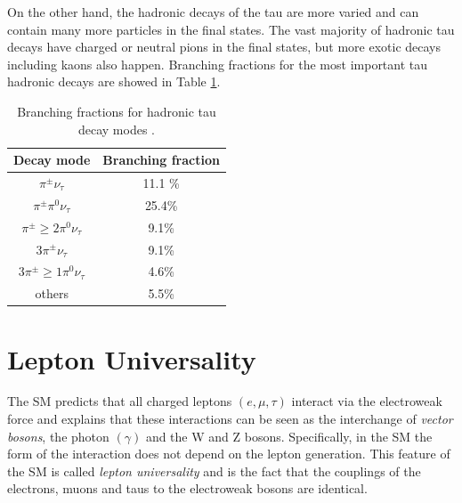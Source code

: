 On the other hand, the hadronic decays of the tau are more varied and can contain many more particles in the final states. The vast majority of hadronic tau decays have charged or neutral pions in the final states, but more exotic decays including kaons also happen. Branching fractions for the most important tau hadronic decays are showed in Table \ref{Table1}.
\begin{table}[]
	\centering
\begin{tabular}{|c|c|}
	\hline
	Decay mode                     & Branching fraction \\ \hline
	$\pi^\pm \nu_\tau$             & 11.1 \%            \\ \hline
	$\pi^\pm \pi^0 \nu_\tau$       & 25.4\%             \\ \hline
	$\pi^\pm \geq 2\pi^0 \nu_\tau$ & 9.1\%               \\ \hline
	$3\pi^\pm \nu_\tau$            & 9.1\%               \\ \hline
	$3\pi^\pm \geq 1\pi^0 \nu_\tau$& 4.6\%               \\ \hline
	others						   & 5.5\%               \\ \hline
\end{tabular}
	\caption{Branching fractions for hadronic tau decay modes \cite{PhysRevD.98.030001}.}
	\label{Table1}
\end{table}
\section{Lepton Universality}\label{chap2sec2}
The SM predicts that all charged leptons $(e,\mu,\tau)$ interact via the electroweak force and explains that these interactions can be seen as the interchange of \textit{vector bosons}, the photon $(\gamma)$ and the W and Z bosons. Specifically, in the SM the form of the interaction does not depend on the lepton generation. This feature of the SM is called \textit{lepton universality} and is the fact that the couplings of the electrons, muons and taus to the electroweak bosons are identical. 

